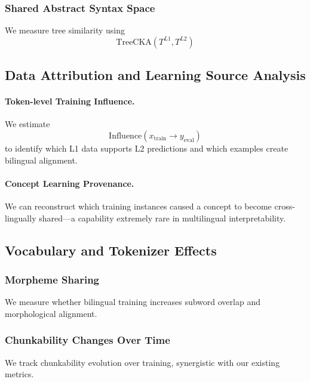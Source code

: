 \subsubsection{Shared Abstract Syntax Space}

We measure tree similarity using
\begin{equation}
\text{TreeCKA}(T^{L1}, T^{L2})
\end{equation}

\subsection{Data Attribution and Learning Source Analysis}

\paragraph{Token-level Training Influence.}  
We estimate
\begin{equation}
\text{Influence}(x_{\text{train}} \rightarrow y_{\text{eval}})
\end{equation}
to identify which L1 data supports L2 predictions and which examples create bilingual alignment.

\paragraph{Concept Learning Provenance.}  
We can reconstruct which training instances caused a concept to become cross-lingually shared—a capability extremely rare in multilingual interpretability.

\subsection{Vocabulary and Tokenizer Effects}

\subsubsection{Morpheme Sharing}

We measure whether bilingual training increases subword overlap and morphological alignment.

\subsubsection{Chunkability Changes Over Time}

We track chunkability evolution over training, synergistic with our existing metrics.


